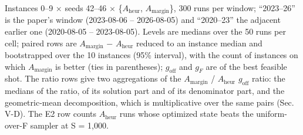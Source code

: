 \documentclass[journal]{IEEEtran}
\begin{document}
Instances 0--9 $\times$ seeds 42--46 $\times$ \{$A_{\mathrm{heur}}$, $A_{\mathrm{margin}}$\}, 300 runs per window; ``2023--26'' is the paper's window (2023-08-06 -- 2026-08-05) and ``2020--23'' the adjacent earlier one (2020-08-05 -- 2023-08-05). Levels are medians over the 50 runs per cell; paired rows are $A_{\mathrm{margin}}$ $-$ $A_{\mathrm{heur}}$ reduced to an instance median and bootstrapped over the 10 instances (95\% interval), with the count of instances on which $A_{\mathrm{margin}}$ is better (ties in parentheses); $g_{\mathrm{off}}$ and $g_{F}$ are of the best feasible shot. The ratio rows give two aggregations of the $A_{\mathrm{margin}}$ / $A_{\mathrm{heur}}$ $g_{\mathrm{off}}$ ratio: the medians of the ratio, of its solution part and of its denominator part, and the geometric-mean decomposition, which is multiplicative over the same pairs (Sec. V-D). The E2 row counts $A_{\mathrm{heur}}$ runs whose optimized state beats the uniform-over-F sampler at S = 1,000.
\end{document}
